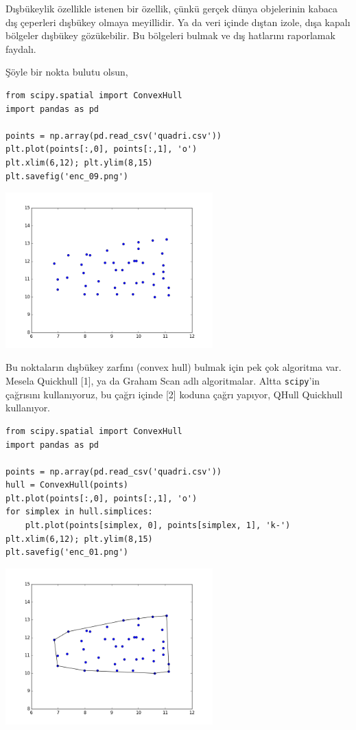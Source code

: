 \documentclass[12pt,fleqn]{article}\usepackage{../../common}
\begin{document}
Dışbükeylik özellikle istenen bir özellik, çünkü gerçek dünya objelerinin
kabaca dış çeperleri dışbükey olmaya meyillidir. Ya da veri içinde dıştan
izole, dışa kapalı bölgeler dışbükey gözükebilir. Bu bölgeleri bulmak ve
dış hatlarını raporlamak faydalı.

Şöyle bir nokta bulutu olsun, 

\begin{verbatim}
from scipy.spatial import ConvexHull
import pandas as pd

points = np.array(pd.read_csv('quadri.csv'))
plt.plot(points[:,0], points[:,1], 'o')
plt.xlim(6,12); plt.ylim(8,15)
plt.savefig('enc_09.png')
\end{verbatim}

\includegraphics[height=6cm]{enc_09.png}

Bu noktaların dışbükey zarfını (convex hull) bulmak için pek çok algoritma
var. Mesela Quickhull [1], ya da Graham Scan adlı algoritmalar. Altta
\verb!scipy!'in çağrısını kullanıyoruz, bu çağrı içinde [2] koduna çağrı
yapıyor, QHull Quickhull kullanıyor.

\begin{verbatim}
from scipy.spatial import ConvexHull
import pandas as pd

points = np.array(pd.read_csv('quadri.csv'))
hull = ConvexHull(points)
plt.plot(points[:,0], points[:,1], 'o')
for simplex in hull.simplices:
    plt.plot(points[simplex, 0], points[simplex, 1], 'k-')
plt.xlim(6,12); plt.ylim(8,15)
plt.savefig('enc_01.png')
\end{verbatim}

\includegraphics[height=6cm]{enc_01.png}
\end{document}
